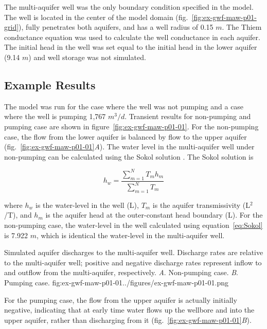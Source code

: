 The multi-aquifer well was the only boundary condition specified in the model. The well is located in the center of the model domain (fig.~\ref{fig:ex-gwf-maw-p01-grid}), fully penetrates both aquifers, and has a well radius of 0.15 $m$. The Thiem conductance equation was used to calculate the well conductance in each aquifer. The initial head in the well was set equal to the initial head in the lower aquifer (9.14 $m$) and well storage was not simulated.

\subsection{Example Results}

The model was run for the case where the well was not pumping and a case where the well is pumping 1,767 $m^{3}/d$. Transient results for non-pumping and pumping case are shown in figure~\ref{fig:ex-gwf-maw-p01-01}. For the non-pumping case, the flow from the lower aquifer is balanced by flow to the upper aquifer (fig.~\ref{fig:ex-gwf-maw-p01-01}\textit{A}). The water level in the multi-aquifer well under non-pumping can be calculated using the Sokol solution \citep{sokol1963position}. The Sokol solution is

\begin{equation}
	\label{eq:Sokol}
	h_w = \frac{\sum\limits_{m=1}^{N} T_m h_m}{\sum\limits_{m=1}^{N} T_m}
\end{equation}

\noindent where $h_w$ is the water-level in the well (L), $T_m$ is the aquifer transmissivity (L$^{2}$/T), and $h_m$ is the aquifer head at the outer-constant head boundary (L). For the non-pumping case, the water-level in the well calculated using equation~\ref{eq:Sokol} is 7.922 $m$, which is identical the water-level in the multi-aquifer well.


\begin{StandardFigure}{
                                     Simulated aquifer discharges to the multi-aquifer well. Discharge rates 
                                     are relative to the multi-aquifer well; positive and negative discharge rates 
                                     represent inflow to and outflow from the multi-aquifer, respectively.                                    
                                     \textit{A}. Non-pumping case.
                                     \textit{B}. Pumping case.
                                     }{fig:ex-gwf-maw-p01-01}{../figures/ex-gwf-maw-p01-01.png}
\end{StandardFigure}                                 

For the pumping case, the flow from the upper aquifer is actually initially negative, indicating that at early time water flows up the wellbore and into the upper aquifer, rather than discharging from it (fig.~\ref{fig:ex-gwf-maw-p01-01}\textit{B}).

